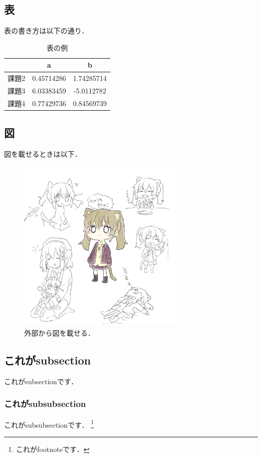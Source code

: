 \documentclass[12pt,a4paper,dvipdfmx]{jsarticle}
\begin{document}
\subsection{表}
表の書き方は以下の通り．
\begin{table}[htb]
    \caption{表の例}
    \label{tab:}
    \centering
    \begin{tabular}{c|c|c}\hline
        & a & b \\\hline\hline
        課題2 & 0.45714286 & 1.74285714\\\hline
        課題3 & 6.03383459 & -5.0112782\\\hline
        課題4 & 0.77429736 & 0.84569739\\\hline
    \end{tabular}
\end{table}

\subsection{図}
図を載せるときは以下．
\begin{figure}[H]
    \centering
    \includegraphics[width=8cm]{./image/Figure_1.png}
    \caption{外部から図を載せる．}
    \label{fig:}
\end{figure}


\subsection{これがsubsection}
これがsubsectionです．
\subsubsection{これがsubsubsection}
これがsubsubsectionです．
\footnote{これがfootnoteです．}
\end{document}
